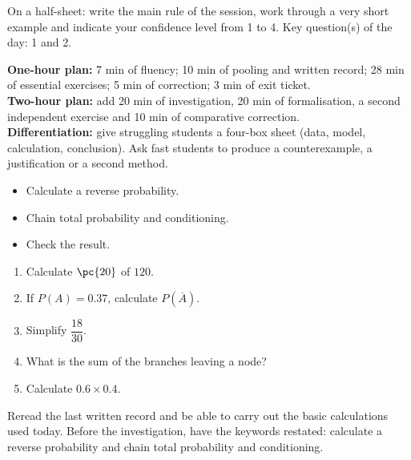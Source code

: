 \begin{exitticket}[3 minutes]On a half-sheet: write the main rule of the session, work through a very short example and indicate your confidence level from 1 to 4. Key question(s) of the day: 1 and 2.\end{exitticket}

\ifmxteacher
\begin{method}
\textbf{One-hour plan:} 7 min of fluency; 10 min of pooling and written record; 28 min of essential exercises; 5 min of correction; 3 min of exit ticket.\\
\textbf{Two-hour plan:} add 20 min of investigation, 20 min of formalisation, a second independent exercise and 10 min of comparative correction.\\
\textbf{Differentiation:} give struggling students a four-box sheet (data, model, calculation, conclusion). Ask fast students to produce a counterexample, a justification or a second method.
\end{method}
\fi
{}
    \begin{objectives}\begin{itemize}\item Calculate a reverse probability.\item Chain total probability and conditioning.\item Check the result.\end{itemize}\end{objectives}
    \begin{fluency}\begin{enumerate}\item Calculate $\pc{20}$ of $120$. \item If $P(A)=\num{0,37}$, calculate $P(\overline A)$. \item Simplify $\dfrac{18}{30}$. \item What is the sum of the branches leaving a node? \item Calculate $\num{0,6}\times\num{0,4}$. \end{enumerate}\end{fluency}
    \begin{prerequisites}Reread the last written record and be able to carry out the basic calculations used today. Before the investigation, have the keywords restated: calculate a reverse probability and chain total probability and conditioning.\end{prerequisites}

